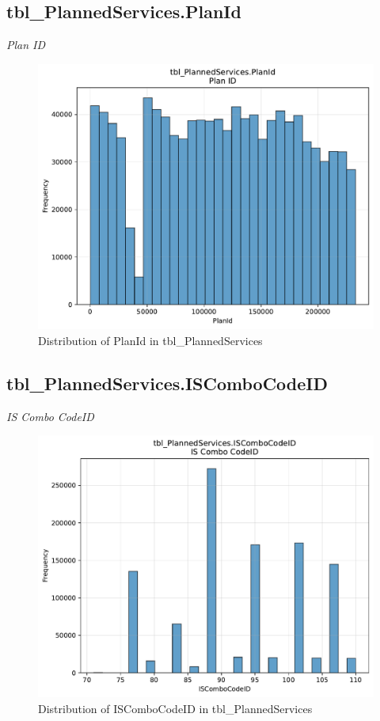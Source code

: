 \subsection{tbl\_PlannedServices.PlanId}
\textit{Plan ID}

\begin{figure}[htbp]
\centering
\includegraphics[width=\textwidth]{figures/dbo_tbl_PlannedServices_PlanId.pdf}
\caption{Distribution of PlanId in tbl\_PlannedServices}
\end{figure}\newpage

\subsection{tbl\_PlannedServices.ISComboCodeID}
\textit{IS Combo CodeID}

\begin{figure}[htbp]
\centering
\includegraphics[width=\textwidth]{figures/dbo_tbl_PlannedServices_ISComboCodeID.pdf}
\caption{Distribution of ISComboCodeID in tbl\_PlannedServices}
\end{figure}\newpage

